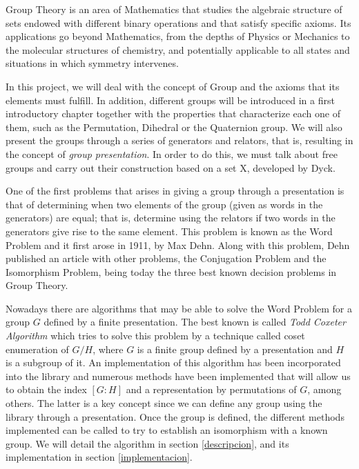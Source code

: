 Group Theory is an area of Mathematics that studies the algebraic structure of sets endowed with different binary operations and that satisfy specific axioms. Its applications go beyond Mathematics, from the depths of Physics or Mechanics to the molecular structures of chemistry, and potentially applicable to all states and situations in which symmetry intervenes.


In this project, we will deal with the concept of Group and the axioms that its elements must fulfill. In addition, different groups will be introduced 
in a first introductory chapter together with the properties that characterize each one of them, such as the Permutation, Dihedral or the Quaternion group.  
We will also present the groups through a series of generators and relators, that is, resulting in the concept of \textit{group presentation}. 
In order to do this, we must talk about free groups and carry out their construction based on a set X, developed by Dyck.


One of the first problems that arises in giving a group through a presentation is that of determining when two elements of the group (given as words in the generators) are equal; that is, determine using the relators if two words in the generators give rise to the same element. This problem is known as the Word Problem and it first arose in 1911, by Max Dehn. Along with this problem, Dehn published an article with other problems, the Conjugation Problem and the Isomorphism Problem, being today the three best known decision problems in Group Theory.





Nowadays there are algorithms that may be able to solve the Word Problem for a group $G$ defined by a finite presentation. The best known is called \textit{Todd Coxeter Algorithm} which tries to solve this problem by a technique called  coset enumeration of $G/H$, where $G$ is a finite group defined by a presentation and $H$ is a subgroup of it.
An implementation of this algorithm has been incorporated into the library and numerous methods have been implemented that will allow us to obtain the index $[G:H]$ and a representation by permutations of $G$, among others. The latter is a key  concept since we can define any group using the library through a presentation. Once the group is defined, the different methods implemented can be called to try to establish an isomorphism with a known group. We will detail the algorithm in section \ref{descripcion}, and its implementation in section \ref{implementacion}.


